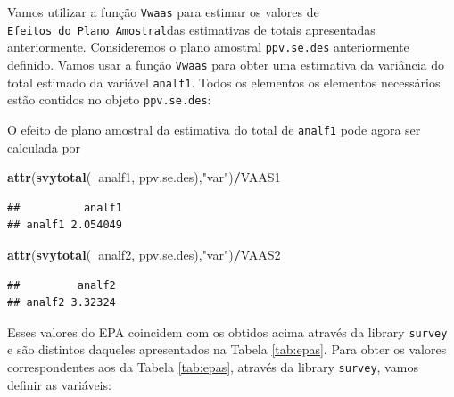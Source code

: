 \documentclass[]{book}
\newenvironment{Shaded}{\begin{snugshade}}{\end{snugshade}}
\newcommand{\KeywordTok}[1]{\textcolor[rgb]{0.13,0.29,0.53}{\textbf{#1}}}
\newcommand{\StringTok}[1]{\textcolor[rgb]{0.31,0.60,0.02}{#1}}
\newcommand{\OperatorTok}[1]{\textcolor[rgb]{0.81,0.36,0.00}{\textbf{#1}}}
\newcommand{\NormalTok}[1]{#1}
\theoremstyle{definition}
\theoremstyle{definition}
\theoremstyle{definition}
\theoremstyle{remark}
\begin{document}
Vamos utilizar a função \texttt{Vwaas} para estimar os valores de
\texttt{Efeitos\ do\ Plano\ Amostral}das estimativas de totais
apresentadas anteriormente. Consideremos o plano amostral
\texttt{ppv.se.des} anteriormente definido. Vamos usar a função
\texttt{Vwaas} para obter uma estimativa da variância do total estimado
da variável \texttt{analf1}. Todos os elementos os elementos necessários
estão contidos no objeto \texttt{ppv.se.des}:

\begin{Shaded}
\end{Shaded}

O efeito de plano amostral da estimativa do total de \texttt{analf1}
pode agora ser calculada por

\begin{Shaded}
\begin{Highlighting}[]
\KeywordTok{attr}\NormalTok{(}\KeywordTok{svytotal}\NormalTok{(}\OperatorTok{~}\NormalTok{analf1, ppv.se.des),}\StringTok{"var"}\NormalTok{)}\OperatorTok{/}\NormalTok{VAAS1}
\end{Highlighting}
\end{Shaded}

\begin{verbatim}
##          analf1
## analf1 2.054049
\end{verbatim}

\begin{Shaded}
\begin{Highlighting}[]
\KeywordTok{attr}\NormalTok{(}\KeywordTok{svytotal}\NormalTok{(}\OperatorTok{~}\NormalTok{analf2, ppv.se.des),}\StringTok{"var"}\NormalTok{)}\OperatorTok{/}\NormalTok{VAAS2}
\end{Highlighting}
\end{Shaded}

\begin{verbatim}
##         analf2
## analf2 3.32324
\end{verbatim}

Esses valores do EPA coincidem com os obtidos acima através da library
\texttt{survey}\citep{R-survey} e são distintos daqueles apresentados na
Tabela \ref{tab:epas}. Para obter os valores correspondentes aos da
Tabela \ref{tab:epas}, através da library
\texttt{survey}\citep{R-survey}, vamos definir as variáveis:
\end{document}
